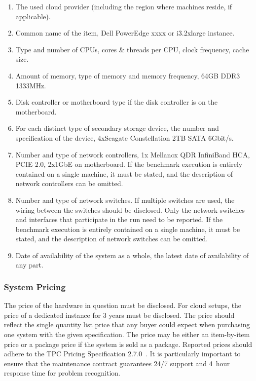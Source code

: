 \begin{enumerate}
    \item The used cloud provider (including the region where machines reside, if applicable).
    \item Common name of the item, \eg Dell PowerEdge xxxx or i3.2xlarge instance.
    \item Type and number of CPUs, cores \& threads per CPU, clock frequency, cache size.
    \item Amount of memory, type of memory and memory frequency, \eg 64GB DDR3 1333MHz.
    \item Disk controller or motherboard type if the disk controller is on the motherboard.
    \item For each distinct type of secondary storage device, the number and specification of the device, \eg 4xSeagate Constellation 2TB SATA 6Gbit/s.
    \item Number and type of network controllers, \eg 1x Mellanox QDR InfiniBand HCA, PCIE 2.0, 2x1GbE on motherboard. If the benchmark execution is entirely contained on a single machine, it must be stated, and the description of network controllers can be omitted.
    \item Number and type of network switches. If multiple switches are used, the wiring between the switches should be disclosed.
          Only the network switches and interfaces that participate in the run need to be reported. If the benchmark execution is entirely contained on a single machine, it must be stated, and the description of network switches can be omitted.
    \item Date of availability of the system as a whole, \ie the latest date of availability of any part.
\end{enumerate}

\subsubsection{System Pricing}
The price of the hardware in question must be disclosed. For cloud setups, the price of a dedicated instance for 3 years must be disclosed. The price should reflect the single quantity list price that any buyer could expect when purchasing one system with the given specification. The price may be either an item-by-item price or a package price if the system is sold as a package.
Reported prices should adhere to the TPC Pricing Specification 2.7.0~\cite{pricing,tpc-pricing}.
It is particularly important to ensure that the maintenance contract guarantees 24/7 support and 4~hour response time for problem recognition.

